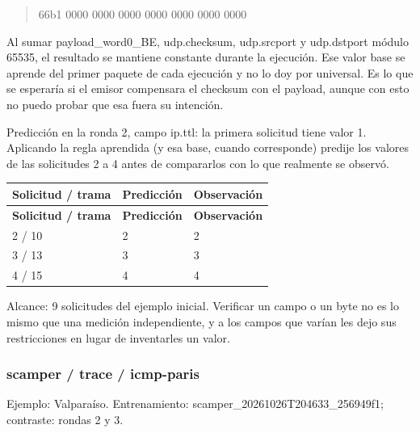 \begin{quote}\ttfamily\footnotesize\raggedright 66b1 0000 0000 0000 0000 0000 0000 0000\end{quote}

Al sumar payload\_word0\_BE, udp.checksum, udp.srcport y udp.dstport módulo 65535, el resultado se mantiene constante durante la ejecución. Ese valor base se aprende del primer paquete de cada ejecución y no lo doy por universal. Es lo que se esperaría si el emisor compensara el checksum con el payload, aunque con esto no puedo probar que esa fuera su intención.

Predicción en la ronda 2, campo ip.ttl: la primera solicitud tiene valor 1. Aplicando la regla aprendida (y esa base, cuando corresponde) predije los valores de las solicitudes 2 a 4 antes de compararlos con lo que realmente se observó.

\begingroup
\fontsize{9}{11}\selectfont
\addtocounter{table}{-1}
\begin{longtable}{p{3.2cm}p{5.1cm}p{5.1cm}}
\toprule
\textbf{Solicitud / trama} & \textbf{Predicción} & \textbf{Observación} \\ \midrule
\endfirsthead
\toprule
\textbf{Solicitud / trama} & \textbf{Predicción} & \textbf{Observación} \\ \midrule
\endhead
2 / 10 & 2 & 2 \\
3 / 13 & 3 & 3 \\
4 / 15 & 4 & 4 \\
\bottomrule
\end{longtable}
\endgroup

Alcance: 9 solicitudes del ejemplo inicial. Verificar un campo o un byte no es lo mismo que una medición independiente, y a los campos que varían les dejo sus restricciones en lugar de inventarles un valor.

\subsubsection{scamper / trace / icmp-paris}
Ejemplo: Valparaíso. Entrenamiento: scamper\_\allowbreak{}20261026T204633\_\allowbreak{}256949f1; contraste: rondas 2 y 3. 

